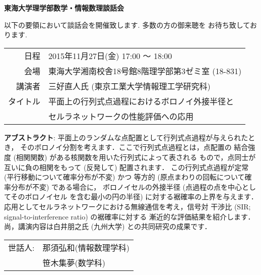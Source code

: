 \documentclass[10pt]{jarticle}
\title{}
\author{}
\date{}
\theoremstyle{definition}
\begin{document}

\begin{center}
 {\bf \Huge 東海大学理学部数学・情報数理談話会}
\end{center}

{\Large
以下の要領において談話会を開催致します. 多数の方の御来聴を
お待ち致しております. 

\smallskip

\begin{center}
  \begin{tabular}{rl}
    日程 & 2015年11月27日(金) 17:00 〜 18:00 \\
    会場 & 東海大学湘南校舎18号館8階理学部第3ゼミ室 (18-831)\\
    講演者 & 三好直人氏 (東京工業大学情報理工学研究科)\\
    タイトル & 平面上の行列式点過程におけるボロノイ外接半径と\\
    & セルラネットワークの性能評価への応用
  \end{tabular}
\end{center}

\vskip 2cm

\noindent
{\bf アブストラクト}:\quad
平面上のランダムな点配置として行列式点過程が与えられたとき，
そのボロノイ分割を考えます．ここで行列式点過程とは，点配置の
結合強度 (相関関数) がある核関数を用いた行列式によって表される
もので，点同士が互いに負の相関をもって (反発して) 配置されます．
この行列式点過程が定常 (平行移動について確率分布が不変) かつ
等方的 (原点まわりの回転について確率分布が不変) である場合に，
ボロノイセルの外接半径 (点過程の点を中心としてそのボロノイセル
を含む最小の円の半径) に対する裾確率の上界を与えます．
応用としてセルラネットワークにおける無線通信を考え，信号対
干渉比 (SIR; signal-to-interference ratio) の裾確率に対する
漸近的な評価結果を紹介します．
尚，講演内容は白井朋之氏 (九州大学) との共同研究の成果です．

\vskip 2cm

\begin{flushright}
  \begin{tabular}{rl}
      世話人: & 那須弘和(情報数理学科)\\
      & 笹木集夢(数学科)
  \end{tabular}

\end{flushright}
}
\end{document}
